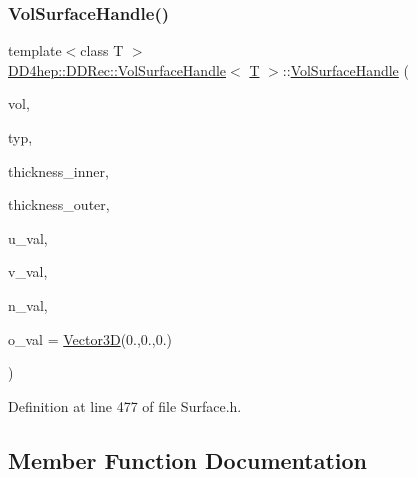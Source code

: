 \subsubsection{\texorpdfstring{Vol\+Surface\+Handle()}{VolSurfaceHandle()}}
{\footnotesize\ttfamily template$<$class T $>$ \\
\hyperlink{class_d_d4hep_1_1_d_d_rec_1_1_vol_surface_handle}{D\+D4hep\+::\+D\+D\+Rec\+::\+Vol\+Surface\+Handle}$<$ \hyperlink{class_t}{T} $>$\+::\hyperlink{class_d_d4hep_1_1_d_d_rec_1_1_vol_surface_handle}{Vol\+Surface\+Handle} (\begin{DoxyParamCaption}\item[{\hyperlink{class_d_d4hep_1_1_geometry_1_1_volume}{Geometry\+::\+Volume}}]{vol,  }\item[{\hyperlink{class_d_d_surfaces_1_1_surface_type}{Surface\+Type}}]{typ,  }\item[{double}]{thickness\+\_\+inner,  }\item[{double}]{thickness\+\_\+outer,  }\item[{\hyperlink{class_d_d_surfaces_1_1_vector3_d}{Vector3D}}]{u\+\_\+val,  }\item[{\hyperlink{class_d_d_surfaces_1_1_vector3_d}{Vector3D}}]{v\+\_\+val,  }\item[{\hyperlink{class_d_d_surfaces_1_1_vector3_d}{Vector3D}}]{n\+\_\+val,  }\item[{\hyperlink{class_d_d_surfaces_1_1_vector3_d}{Vector3D}}]{o\+\_\+val = {\ttfamily \hyperlink{class_d_d_surfaces_1_1_vector3_d}{Vector3D}(0.,0.,0.)} }\end{DoxyParamCaption})\hspace{0.3cm}{\ttfamily [inline]}}



Definition at line 477 of file Surface.\+h.



\subsection{Member Function Documentation}
\hypertarget{class_d_d4hep_1_1_d_d_rec_1_1_vol_surface_handle_a4151ddc65e68b405fb406ebb6b6622a1}{}\label{class_d_d4hep_1_1_d_d_rec_1_1_vol_surface_handle_a4151ddc65e68b405fb406ebb6b6622a1} 
